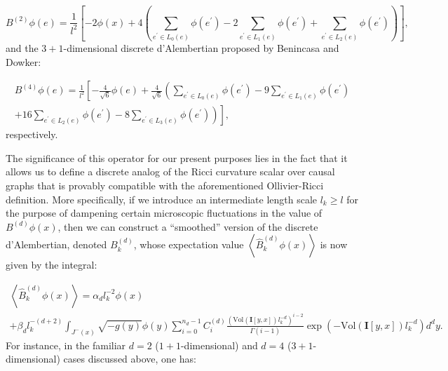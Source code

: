 \documentclass{article}
\begin{document}
\begin{equation}
B^{\left( 2 \right)} \phi \left( e \right) = \frac{1}{l^2} \left[ - 2 \phi \left( x \right) + 4 \left( \sum_{e^{\prime} \in L_0 \left( e \right)} \phi \left( e^{\prime} \right) - 2 \sum_{e^{\prime} \in L_1 \left( e \right)} \phi \left( e^{\prime} \right) + \sum_{e^{\prime} \in L_2 \left( e \right)} \phi \left( e^{\prime} \right) \right) \right],
\end{equation}
and the ${3 + 1}$-dimensional discrete d'Alembertian proposed by Benincasa and Dowker\cite{benincasa}:

\begin{multline}
B^{\left( 4 \right)} \phi \left( e \right) = \frac{1}{l^2} \left[ - \frac{4}{\sqrt{6}} \phi \left( e \right) + \frac{4}{\sqrt{6}} \left( \sum_{e^{\prime} \in L_0 \left( e \right)} \phi \left( e^{\prime} \right) - 9 \sum_{e^{\prime} \in L_1 \left( e \right)} \phi \left( e^{\prime} \right) \right. \right.\\
\left. \left. + 16 \sum_{e^{\prime} \in L_2 \left( e \right)} \phi \left( e^{\prime} \right) - 8 \sum_{e^{\prime} \in L_3 \left( e \right)} \phi \left( e^{\prime} \right) \right) \right],
\end{multline}
respectively.

The significance of this operator for our present purposes lies in the fact that it allows us to define a discrete analog of the Ricci curvature scalar over causal graphs that is provably compatible with the aforementioned Ollivier-Ricci definition. More specifically, if we introduce an intermediate length scale ${l_k \geq l}$ for the purpose of dampening certain microscopic fluctuations in the value of ${B^{\left( d \right)} \phi \left( x \right)}$, then we can construct a ``smoothed'' version of the discrete d'Alembertian, denoted ${B_{k}^{\left( d \right)}}$, whose expectation value ${\left\langle \hat{B}_{k}^{\left( d \right)} \phi \left( x \right) \right\rangle}$ is now given by the integral:

\begin{multline}
\left\langle \hat{B}_{k}^{\left( d \right)} \phi \left( x \right) \right\rangle = \alpha_d l_{k}^{-2} \phi \left( x \right)\\
+ \beta_d l_{k}^{- \left( d + 2 \right)} \int_{J^{-} \left( x \right)} \sqrt{-g \left( y \right)} \phi \left( y \right) \sum_{i = 0}^{n_d - 1} C_{i}^{\left( d \right)} \frac{\left( \mathrm{Vol} \left( \mathbf{I} \left[ y, x \right] \right) l_{k}^{-d} \right)^{i - 2}}{\Gamma \left( i - 1 \right)} \exp \left( - \mathrm{Vol} \left( \mathbf{I} \left[ y, x \right] \right) l_{k}^{-d} \right) d^d y.
\end{multline}
For instance, in the familiar ${d = 2}$ (${1 + 1}$-dimensional) and ${d = 4}$ (${3 + 1}$-dimensional) cases discussed above, one has:
\end{document}
